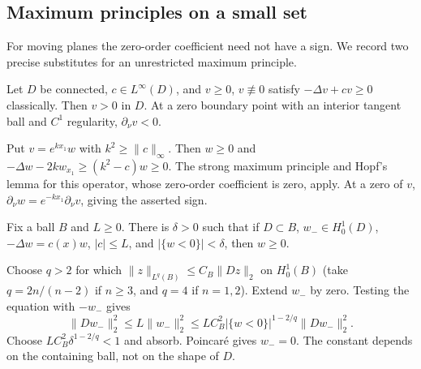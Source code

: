 \Needspace{40mm}
\subsection{Maximum principles on a small set}
For moving planes the zero-order coefficient need not have a sign.
We record two precise substitutes for an unrestricted maximum principle.
\Needspace{50mm}
\begin{lemma}
Let $D$ be connected, $c\in L^\infty(D)$, and $v\geq0$, $v\not\equiv0$
satisfy $-\Delta v+cv\geq0$ classically. Then $v>0$ in $D$.
At a zero boundary point with an interior tangent ball and $C^1$
regularity, $\partial_\nu v<0$.
\end{lemma}
\begin{expandedproof}
Put $v=e^{kx_1}w$ with $k^2\geq\|c\|_\infty$.
Then $w\geq0$ and
$-\Delta w-2kw_{x_1}\geq(k^2-c)w\geq0$.
The strong maximum principle and Hopf's lemma for this operator, whose
zero-order coefficient is zero, apply. At a zero of $v$,
$\partial_\nu w=e^{-kx_1}\partial_\nu v$, giving the asserted sign.
\end{expandedproof}
\Needspace{50mm}
\begin{lemma}
Fix a ball $B$ and $L\geq0$. There is $\delta>0$ such that if
$D\subset B$, $w_-\in H^1_0(D)$, $-\Delta w=c(x)w$,
$|c|\leq L$, and $|\{w<0\}|<\delta$, then $w\geq0$.
\end{lemma}
\begin{expandedproof}
Choose $q>2$ for which $\|z\|_{L^q(B)}\leq C_B\|Dz\|_2$ on
$H^1_0(B)$ (take $q=2n/(n-2)$ if $n\geq3$, and $q=4$ if $n=1,2$).
Extend $w_-$ by zero. Testing the equation with $-w_-$ gives
\[
 \|Dw_-\|_2^2\leq L\|w_-\|_2^2
 \leq LC_B^2|\{w<0\}|^{1-2/q}\|Dw_-\|_2^2.
\]
Choose $LC_B^2\delta^{1-2/q}<1$ and absorb. Poincar\'e gives $w_-=0$.
The constant depends on the containing ball, not on the shape of $D$.
\end{expandedproof}
\Needspace{42mm}

\Needspace{40mm}
